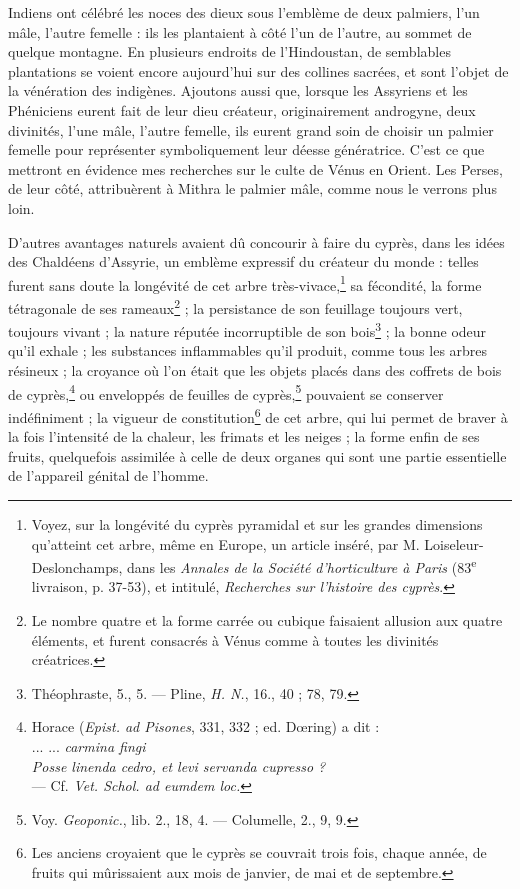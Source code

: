 \documentclass[a4paper, 11pt, oneside, polutonikogreek, french]{article}
\begin{document}
Indiens ont célébré les noces des dieux sous l'emblème de deux palmiers, l'un mâle, l'autre femelle : ils les plantaient à côté l'un de l'autre, au sommet de quelque montagne. En plusieurs endroits de l'Hindoustan, de semblables plantations se voient encore aujourd'hui sur des collines sacrées, et sont l'objet de la vénération des indigènes. Ajoutons aussi que, lorsque les Assyriens et les Phéniciens eurent fait de leur dieu créateur, originairement androgyne, deux divinités, l'une mâle, l'autre femelle, ils eurent grand soin de choisir un palmier femelle pour représenter symboliquement leur déesse génératrice. C'est ce que mettront en évidence mes recherches sur le culte de Vénus en Orient. Les Perses, de leur côté, attribuèrent à Mithra le palmier mâle, comme nous le verrons plus loin.

D'autres avantages naturels avaient dû concourir à faire du cyprès, dans les idées des Chaldéens d'Assyrie, un emblème expressif du créateur du monde : telles furent sans doute la longévité de cet arbre très-vivace,\footnote{Voyez, sur la longévité du cyprès pyramidal et sur les grandes dimensions qu'atteint cet arbre, même en Europe, un article inséré, par M. Loiseleur-Deslonchamps, dans les \emph{Annales de la Société d'horticulture à Paris} (83\textsuperscript{e} livraison, p. 37-53), et intitulé, \emph{Recherches sur l'histoire des cyprès}.} sa fécondité, la forme tétragonale de ses rameaux\footnote{Le nombre quatre et la forme carrée ou cubique faisaient allusion aux quatre éléments, et furent consacrés à Vénus comme à toutes les divinités créatrices.} ; la persistance de son feuillage toujours vert, toujours vivant ; la nature réputée incorruptible de son bois\footnote{Théophraste, 5., 5. --- Pline, \emph{H. N.}, 16., 40 ; 78, 79.} ; la bonne odeur qu'il exhale ; les substances inflammables qu'il produit, comme tous les arbres résineux ; la croyance où l'on était que les objets placés dans des coffrets de bois de cyprès,\footnote{Horace (\emph{Epist. ad Pisones}, 331, 332 ; ed. Dœring) a dit :\\\hspace*{10mm}... ... \emph{carmina fingi}\\\hspace*{10mm}\emph{Posse linenda cedro, et levi servanda cupresso ?}\\\hspace*{5mm}--- Cf. \emph{Vet. Schol. ad eumdem loc.}} ou enveloppés de feuilles de cyprès,\footnote{Voy. \emph{Geoponic.}, lib. 2., 18, 4. --- Columelle, 2., 9, 9.} pouvaient se conserver indéfiniment ; la vigueur de constitution\footnote{Les anciens croyaient que le cyprès se couvrait trois fois, chaque année, de fruits qui mûrissaient aux mois de janvier, de mai et de septembre.} de cet arbre, qui lui permet de braver à la fois l'intensité de la chaleur, les frimats et les neiges ; la forme enfin de ses fruits, quelquefois assimilée à celle de deux organes qui sont une partie essentielle de l'appareil génital de l'homme.
\end{document}

